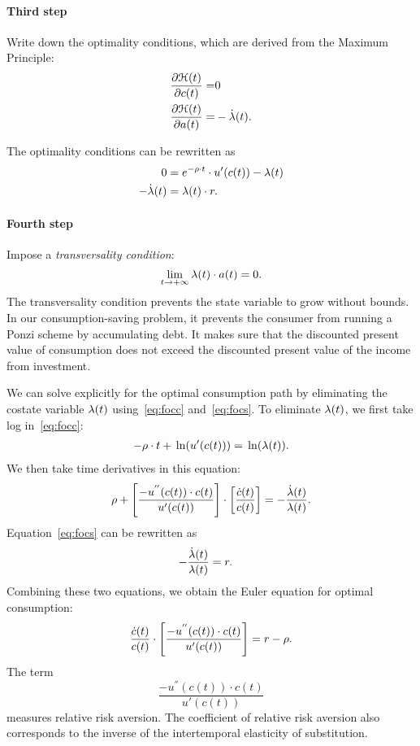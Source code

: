\documentclass[letterpaper,12pt,leqno]{article}
\begin{document}
\paragraph{Third step}  Write down the optimality conditions, which are derived from the Maximum Principle:
\begin{align}
\frac{\partial \mathcal{H}(t)}{\partial c(t)}=& 0 \label{eq:foc1}\\
\frac{\partial \mathcal{H}(t)}{\partial a(t)}=&-\dot{\lambda}(t)\label{eq:foc2}.
\end{align}

The optimality conditions can be rewritten as
\begin{align}
0 &= e^{-\rho \cdot t}\cdot u'(c(t)) -\lambda(t)\label{eq:focc} \\
-\dot{\lambda}(t)&= \lambda(t)\cdot  r  \label{eq:focs}.
\end{align}

\paragraph{Fourth step} Impose a \textit{transversality condition}:
\begin{equation}
\lim_{t\to+\infty} \lambda(t)\cdot a(t)=0.\label{eq:trans1}
\end{equation}
The transversality condition prevents the state variable to grow without bounds. In our consumption-saving problem, it prevents the consumer from running a Ponzi scheme by accumulating debt.  It makes sure that the discounted present value of consumption does not exceed the discounted present value of the income from investment.

We can solve explicitly for the optimal consumption path  by eliminating the costate variable $\lambda(t)$ using~\eqref{eq:focc} and~\eqref{eq:focs}. To eliminate $\lambda(t)$, we first take log  in~\eqref{eq:focc}:
\begin{align*}
-\r \cdot t+ \ln{u'(c(t))} =\ln{\l(t)}.
\end{align*}
We then take time derivatives in this equation:
\begin{equation*}
\rho+\left[  \frac{-u^{''}(c(t)) \cdot c(t)}{u'(c(t))} \right]\cdot \left[ \frac{\dot{c}(t)}{c(t)} \right] =-\frac{\dot{\lambda}(t)}{\lambda(t)}.
\end{equation*}
Equation~\eqref{eq:focs} can be rewritten as
\begin{align*}
-\frac{\dot{\lambda}(t)}{\lambda(t)}&=  r.
\end{align*}
Combining these two equations, we obtain the Euler equation for optimal consumption:
\begin{equation}
\frac{\dot{c}(t)}{c(t)}\cdot \left[ \frac{-u^{''}(c(t)) \cdot c(t)}{u'(c(t)) } \right] =r-\rho.
\label{eq:EULER}\end{equation}
The term \[\frac{-u^{''}(c(t))\cdot  c(t)}{u'(c(t))}\] measures relative risk aversion. The coefficient of relative risk aversion also corresponds to the inverse of the intertemporal elasticity of substitution.
\end{document}
